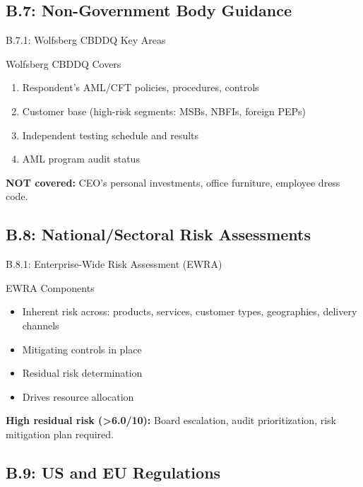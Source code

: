 \documentclass{beamer}
\begin{document}
	\subsection{B.7: Non-Government Body Guidance}
	
	\begin{frame}{B.7.1: Wolfsberg CBDDQ Key Areas}
		\begin{block}{Wolfsberg CBDDQ Covers}
			\begin{enumerate}
				\item Respondent's AML/CFT policies, procedures, controls
				\item Customer base (high-risk segments: MSBs, NBFIs, foreign PEPs)
				\item Independent testing schedule and results
				\item AML program audit status
			\end{enumerate}
		\end{block}
		\textbf{NOT covered:} CEO's personal investments, office furniture, employee dress code.
	\end{frame}
	
	\subsection{B.8: National/Sectoral Risk Assessments}
	
	\begin{frame}{B.8.1: Enterprise-Wide Risk Assessment (EWRA)}
		\begin{block}{EWRA Components}
			\begin{itemize}
				\item Inherent risk across: products, services, customer types, geographies, delivery channels
				\item Mitigating controls in place
				\item Residual risk determination
				\item Drives resource allocation
			\end{itemize}
		\end{block}
		\textbf{High residual risk (>6.0/10):} Board escalation, audit prioritization, risk mitigation plan required.
	\end{frame}
	
	\subsection{B.9: US and EU Regulations}
	
\end{document}
